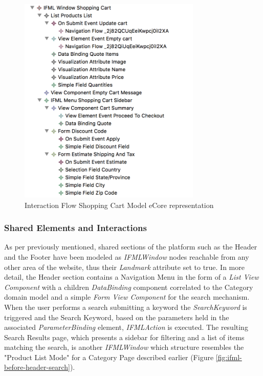 \vspace{0.5cm}
\begin{figure}[H]
  \centering
    \includegraphics[height=10cm]{images/diagrams/before/ifml-hierarchy-shoppingcart.png}
  \caption{Interaction Flow Shopping Cart Model eCore representation}
  \label{fig:ifml-before-hierarchy-shoppingcart}
\end{figure}
\vspace{0.5cm}

\subsubsection{Shared Elements and Interactions}

As per previously mentioned, shared sections of the platform such as the Header and the Footer have been modeled as \textit{IFMLWindow} nodes reachable from any other area of the website, thus their \textit{Landmark} attribute set to true.
In more detail, the Header section contains a Navigation Menu in the form of a \textit{List View Component} with a children \textit{DataBinding} component correlated to the Category domain model and a simple \textit{Form View Component} for the search mechanism. When the user performs a search submitting a keyword the \textit{SearchKeyword} is triggered and the Search Keyword, based on the parameters held in the associated \textit{ParameterBinding} element, \textit{IFMLAction} is executed.  The resulting Search Results page, which presents a sidebar for filtering and a list of items matching the search, is another \textit{IFMLWindow} which structure resembles the "Product List Mode" for a Category Page described earlier (Figure \ref{fig:ifml-before-header-search}).

